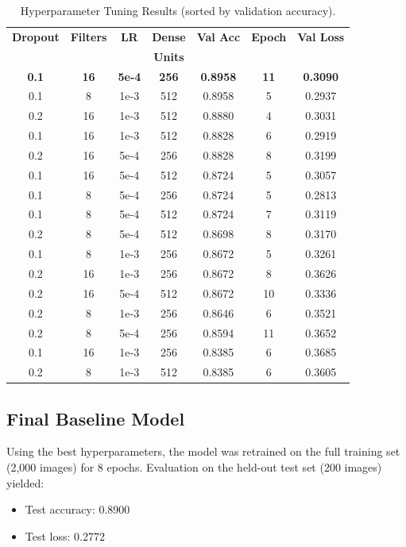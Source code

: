 \documentclass[conference]{IEEEtran}
\begin{document}
\begin{table}[htbp]
	\caption{Hyperparameter Tuning Results (sorted by validation accuracy).}
	\label{table:hp_results}
	\centering
	\begin{adjustbox}{width=0.48\textwidth}
		\begin{tabular}{|c|c|c|c|c|c|c|}
			\hline
			\textbf{Dropout} & \textbf{Filters} & \textbf{LR} & \textbf{Dense} & \textbf{Val Acc} & \textbf{Epoch} & \textbf{Val Loss} \\
			& & & \textbf{Units} & & & \\
			\hline
			\rowcolor{yellow}
			\bfseries 0.1 & \bfseries 16 & \bfseries 5e‑4 & \bfseries 256 & \bfseries 0.8958 & \bfseries 11 & \bfseries 0.3090 \\
			0.1 & 8  & 1e‑3 & 512 & 0.8958 &  5 & 0.2937 \\
			0.2 & 16 & 1e‑3 & 512 & 0.8880 &  4 & 0.3031 \\
			0.1 & 16 & 1e‑3 & 512 & 0.8828 &  6 & 0.2919 \\
			0.2 & 16 & 5e‑4 & 256 & 0.8828 &  8 & 0.3199 \\
			0.1 & 16 & 5e‑4 & 512 & 0.8724 &  5 & 0.3057 \\
			0.1 & 8  & 5e‑4 & 256 & 0.8724 &  5 & 0.2813 \\
			0.1 & 8  & 5e‑4 & 512 & 0.8724 &  7 & 0.3119 \\
			0.2 & 8  & 5e‑4 & 512 & 0.8698 &  8 & 0.3170 \\
			0.1 & 8  & 1e‑3 & 256 & 0.8672 &  5 & 0.3261 \\
			0.2 & 16 & 1e‑3 & 256 & 0.8672 &  8 & 0.3626 \\
			0.2 & 16 & 5e‑4 & 512 & 0.8672 & 10 & 0.3336 \\
			0.2 & 8  & 1e‑3 & 256 & 0.8646 &  6 & 0.3521 \\
			0.2 & 8  & 5e‑4 & 256 & 0.8594 & 11 & 0.3652 \\
			0.1 & 16 & 1e‑3 & 256 & 0.8385 &  6 & 0.3685 \\
			0.2 & 8  & 1e‑3 & 512 & 0.8385 &  6 & 0.3605 \\
			\hline
		\end{tabular}
	\end{adjustbox}
\end{table}

\subsection{Final Baseline Model}
Using the best hyperparameters, the model was retrained on the full training set (2,000 images) for 8 epochs. Evaluation on the held-out test set (200 images) yielded:
\begin{itemize}
	\item Test accuracy: 0.8900
	\item Test loss: 0.2772
\end{itemize}
\end{document}
